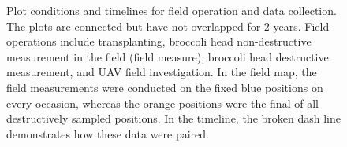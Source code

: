 \begin{figure}[htb]
  \begin{center}
  \end{center}
  \caption[Plot conditions and timelines for field operation and data collection]{
    Plot conditions and timelines for field operation and data collection. The plots are connected but have not overlapped for 2 years. Field operations include transplanting, broccoli head non-destructive measurement in the field (field measure), broccoli head destructive measurement, and UAV field investigation. In the field map, the field measurements were conducted on the fixed blue positions on every occasion, whereas the orange positions were the final of all destructively sampled positions. In the timeline, the broken dash line demonstrates how these data were paired.
  }
  \label{fig:cp4.5}
\end{figure}